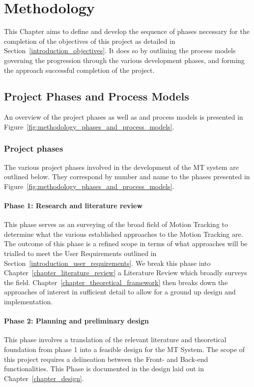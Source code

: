 \chapter{Methodology}\label{chapter_methodology}
This Chapter aims to define and develop the sequence of phases necessary for the completion
of the objectives of this project as detailed in
Section~\ref{introduction_objectives}. It does so by outlining the process
models governing the progression through the various development phases, and
forming the approach successful completion of the project.

\section{Project Phases and Process Models }
An overview of the project phases as well as and process models is presented in
Figure~\ref{fig:methodology_phases_and_process_models}.

\subsection{Project phases}
The various project phases involved in the development of the MT system are
outlined below. They correspond by number and name to the phases presented in
Figure~\ref{fig:methodology_phases_and_process_models}.

\subsubsection{Phase 1: Research and literature review}
This phase serves as an surveying of the broad field of Motion Tracking to
determine what the various established approaches to the Motion Tracking are.
The outcome of this phase is a refined scope in terms of what approaches will be
trialled to meet the User Requirements outlined in
Section~\ref{introduction_user_requirements}. We break this phase into
Chapter~\ref{chapter_literature_review} a Literature Review which broadly
surveys the field. Chapter~\ref{chapter_theoretical_framework} then breaks down
the approaches of interest in sufficient detail to allow for a ground up design
and implementation.

\subsubsection{Phase 2: Planning and preliminary design}
This phase involves a translation of the relevant literature and theoretical
foundation from phase 1 into a feasible design for the MT System. The scope of
this project requires a delineation between the Front- and Back-end
functionalities. This Phase is documented in the design laid out in
Chapter~\ref{chapter_design}.

